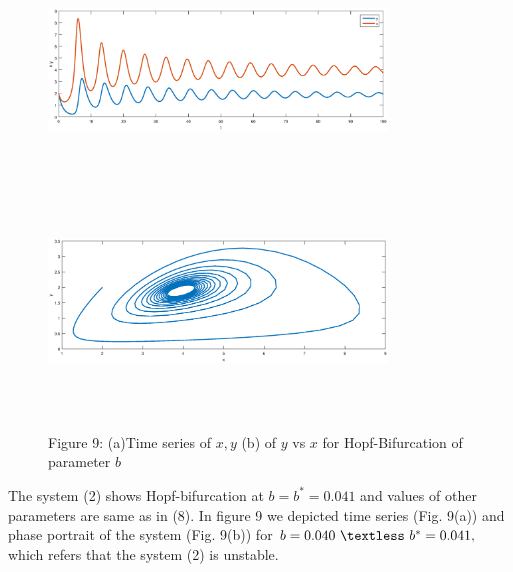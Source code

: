 \documentclass[a4paper, 10pt]{article}
\begin{document}
\begin{figure}[H]
	{\includegraphics[width=9cm, height=6cm]{16a.eps}}
	\endminipage\hfill
	{\includegraphics[width=9cm, height=6cm]{16b.eps}}
	\endminipage\hfill
	\begin{center} Figure 9: (a)Time series of $x,y$  (b)  of $y$ vs $x$ for Hopf-Bifurcation of parameter $b$   \end{center}
\end{figure}
The system (2) shows Hopf-bifurcation at $b=b^*=0.041$ and values of other parameters are same as in (8). In figure 9 we depicted time series (Fig. 9(a)) and phase portrait of the system (Fig. 9(b)) for $b=0.040~\textless~b^*=0.041,$ which refers that the system (2) is unstable.
\end{document}
